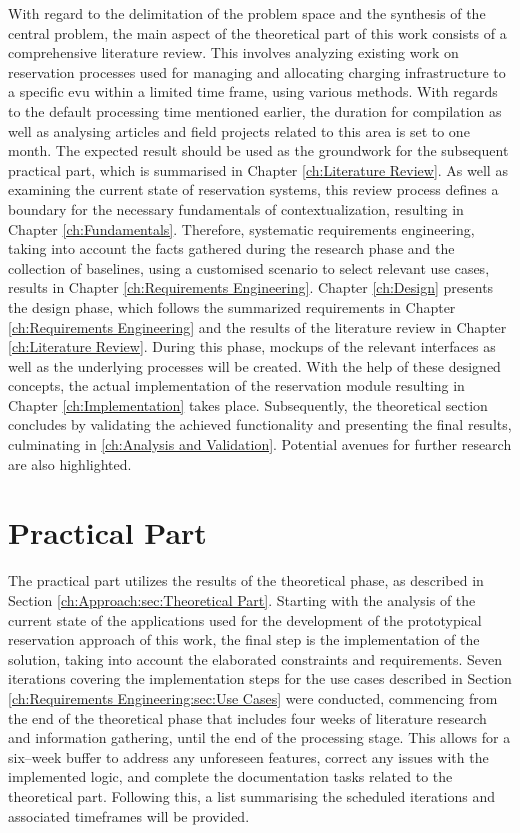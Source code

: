 With regard to the delimitation of the problem space and the synthesis of the central problem, the main aspect of the theoretical part of this work consists of a comprehensive literature review.
This involves analyzing existing work on reservation processes used for managing  and allocating charging infrastructure to a specific \acrshort{evu} within a limited time frame, using various methods.
With regards to the default processing time mentioned earlier, the duration for compilation as well as analysing articles and field projects related to this area is set to one month.
The expected result should be used as the groundwork for the subsequent practical part, which is summarised in Chapter \ref{ch:Literature Review}.
As well as examining the current state of reservation systems, this review process defines a boundary for the necessary fundamentals of contextualization, resulting in Chapter \ref{ch:Fundamentals}.
Therefore, systematic requirements engineering, taking into account the facts gathered during the research phase and the collection of baselines, using a customised scenario to select relevant use cases, results in Chapter \ref{ch:Requirements Engineering}.
Chapter \ref{ch:Design} presents the design phase, which follows the summarized requirements in Chapter \ref{ch:Requirements Engineering} and the results of the literature review in Chapter \ref{ch:Literature Review}. During this phase, mockups of the relevant interfaces as well as the underlying processes will be created.
With the help of these designed concepts, the actual implementation of the reservation module resulting in Chapter \ref{ch:Implementation} takes place.
Subsequently, the theoretical section concludes by validating the achieved functionality and presenting the final results, culminating in \ref{ch:Analysis and Validation}. Potential avenues for further research are also highlighted.

\section{Practical Part}
\label{ch:Approach:sec:Practical Part}

The practical part utilizes the results of the theoretical phase, as described in Section \ref{ch:Approach:sec:Theoretical Part}. Starting with the analysis of the current state of the applications used for the development of the prototypical reservation approach of this work, the final step is the implementation of the solution, taking into account the elaborated constraints and requirements.
Seven iterations covering the implementation steps for the use cases described in Section \ref{ch:Requirements Engineering:sec:Use Cases} were conducted, commencing from the end of the theoretical phase that includes four weeks of literature research and information gathering, until the end of the processing stage.
This allows for a six--week buffer to address any unforeseen features, correct any issues with the implemented logic, and complete the documentation tasks related to the theoretical part.
Following this, a list summarising the scheduled iterations and associated timeframes will be provided.

